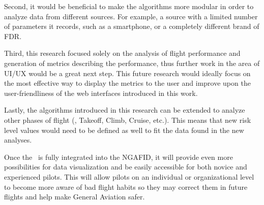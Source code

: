	Second, it would be beneficial to make the algorithms more modular in order to analyze data from different sources.  For example, a source with a limited number of parameters it records, such as a smartphone, or a completely different brand of FDR.
	
	Third, this research focused solely on the analysis of flight performance and generation of metrics describing the performance, thus further work in the area of UI/UX would be a great next step.  This future research would ideally focus on the most effective way to display the metrics to the user and improve upon the user-friendliness of the web interfaces introduced in this work.
	
	Lastly, the algorithms introduced in this research can be extended to analyze other phases of flight (\ie, Takeoff, Climb, Cruise, etc.).  This means that new risk level values would need to be defined as well to fit the data found in the new analyses.
    
    Once the \toolname\ is fully integrated into the NGAFID, it will provide even more possibilities for data visualization and be easily accessible for both novice and experienced pilots.  This will allow pilots on an individual or organizational level to become more aware of bad flight habits so they may correct them in future flights and help make General Aviation safer.